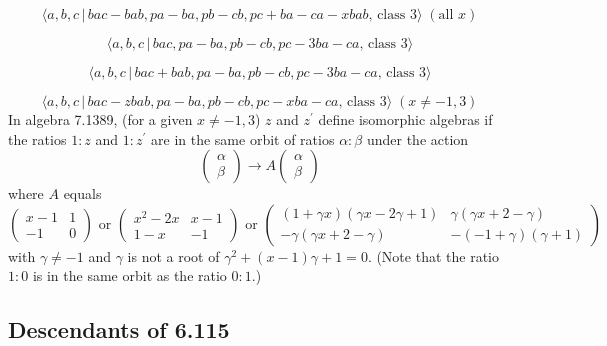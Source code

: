 \documentclass[10pt]{article}
\begin{document}
\begin{equation}
\langle a,b,c\,|\,bac-bab,pa-ba,pb-cb,pc+ba-ca-xbab,\,\text{class }3\rangle
\;(\text{all }x)  \tag{7.1386}
\end{equation}

\begin{equation}
\langle a,b,c\,|\,bac,pa-ba,pb-cb,pc-3ba-ca,\,\text{class }3\rangle 
\tag{7.1387}
\end{equation}

\begin{equation}
\langle a,b,c\,|\,bac+bab,pa-ba,pb-cb,pc-3ba-ca,\,\text{class }3\rangle 
\tag{7.1388}
\end{equation}

\begin{equation}
\langle a,b,c\,|\,bac-zbab,pa-ba,pb-cb,pc-xba-ca,\,\text{class }3\rangle
\;(x\neq -1,3)  \tag{7.1389}
\end{equation}%
In algebra 7.1389, (for a given $x\neq -1,3$) $z$ and $z^{\prime }$ define
isomorphic algebras if the ratios $1:z$ and $1:z^{\prime }$ are in the same
orbit of ratios $\alpha :\beta $ under the action%
\[
\left( 
\begin{array}{c}
\alpha \\ 
\beta%
\end{array}%
\right) \rightarrow A\left( 
\begin{array}{c}
\alpha \\ 
\beta%
\end{array}%
\right) 
\]%
where $A$ equals%
\[
\left( 
\begin{array}{cc}
x-1 & 1 \\ 
-1 & 0%
\end{array}%
\right) \text{ or }\left( 
\begin{array}{cc}
x^{2}-2x & x-1 \\ 
1-x & -1%
\end{array}%
\right) \text{ or }\left( 
\begin{array}{cc}
\allowbreak \left( 1+\gamma x\right) \left( \gamma x-2\gamma +1\right) & 
\allowbreak \gamma \left( \gamma x+2-\gamma \right) \\ 
-\gamma \left( \gamma x+2-\gamma \right) & -\left( -1+\gamma \right) \left(
\gamma +1\right)%
\end{array}%
\right) 
\]%
with $\gamma \neq -1$ and $\gamma $ is not a root of $\allowbreak \gamma
^{2}+(x-1)\gamma +1=0$. (Note that the ratio $1:0$ is in the same orbit as
the ratio $0:1$.)

\subsection{Descendants of 6.115}
\end{document}
